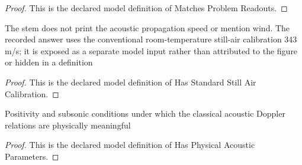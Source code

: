 \begin{proof}
  This is the declared model definition of Matches Problem Readouts.
\end{proof}
\begin{definition}
  \label{def:physics:phyx-mini-0327:phyxminiproblems-problemphyxmini0327-hasstandardstillaircalibration}
  The stem does not print the acoustic propagation speed or mention wind. The recorded answer uses the conventional room-temperature still-air calibration 343 m/s; it is exposed as a separate model input rather than attributed to the figure or hidden in a definition
\end{definition}
\begin{proof}
  This is the declared model definition of Has Standard Still Air Calibration.
\end{proof}
\begin{definition}
  \label{def:physics:phyx-mini-0327:phyxminiproblems-problemphyxmini0327-hasphysicalacousticparameters}
  Positivity and subsonic conditions under which the classical acoustic Doppler relations are physically meaningful
\end{definition}
\begin{proof}
  This is the declared model definition of Has Physical Acoustic Parameters.
\end{proof}
